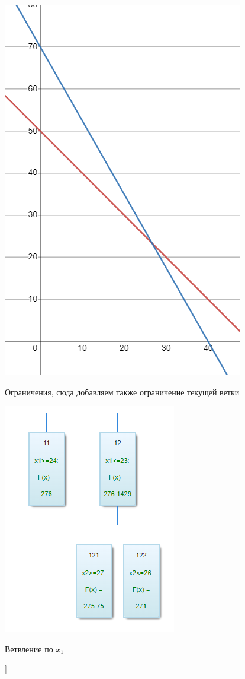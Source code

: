 \includegraphics[scale=0.7]{pics/dop27_1.png}

Ограничения, сюда добавляем также ограничение текущей ветки


\includegraphics{pics/dop27_2.png}

Ветвление по $x_1$

\bigbreak
[\cite[page 69-96]{replace_me}]